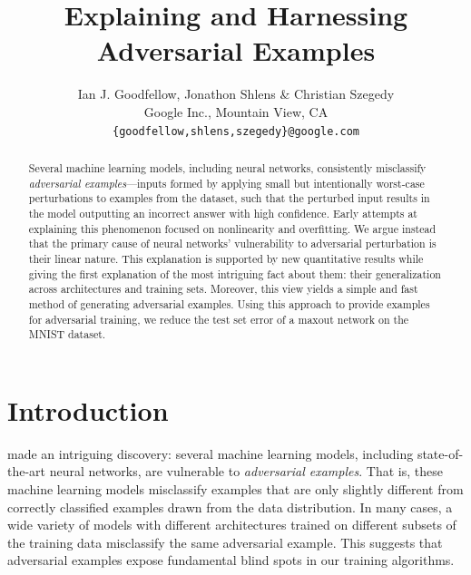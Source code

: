 \documentclass{article} %
\title{Explaining and Harnessing\\ Adversarial Examples}
\author{
Ian J. Goodfellow, Jonathon Shlens \& Christian Szegedy \\
Google Inc., Mountain View, CA\\
\texttt{\{goodfellow,shlens,szegedy\}@google.com} \\
}
\begin{document}
\maketitle
\begin{abstract}
    \vspace{-.1in}
Several machine learning models, including neural networks, consistently
misclassify {\em adversarial examples}---inputs formed
by applying small but intentionally worst-case perturbations to examples from the dataset,
such that the perturbed input results in the model outputting an incorrect
answer with high confidence.
Early attempts at explaining this phenomenon focused on nonlinearity and overfitting.
We argue instead that the primary cause of neural networks' vulnerability to adversarial
perturbation is their linear nature.
This explanation is supported by new quantitative results while
giving the first explanation of the most intriguing fact about
them: their generalization across architectures and training sets.
Moreover, this view yields a simple and fast method of generating adversarial examples.
Using this approach to provide examples for adversarial training, we reduce the test
set error of a maxout network on the MNIST dataset.
\vspace{-.05in}
\end{abstract}
\vspace{-.1in}
\section{Introduction}
\citet{Szegedy-ICLR2014} made an intriguing discovery: several machine learning models,
including state-of-the-art neural networks, are vulnerable to {\em adversarial examples}.
That is, these machine learning models misclassify examples that are only slightly different
from correctly classified examples drawn from the data distribution.
In many cases, a wide variety of models with different architectures trained
on different subsets of the training data misclassify the same adversarial example.
This suggests that adversarial examples expose
fundamental blind spots in our training algorithms.
\end{document}
